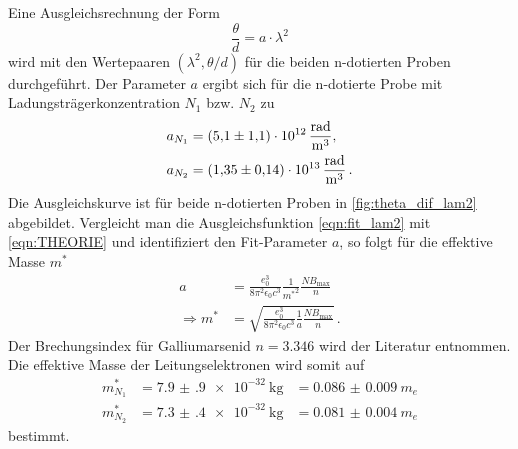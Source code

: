 Eine Ausgleichsrechnung der Form
\begin{equation}
    \frac{\theta}{d} = a \cdot \lambda^2
    \label{eqn:fit_lam2}
\end{equation}
wird mit den Wertepaaren $(\lambda^2, \theta / d)$ für die beiden n-dotierten Proben durchgeführt.
Der Parameter $a$ ergibt sich für die n-dotierte Probe mit Ladungsträgerkonzentration $N_1$ bzw. $N_2$ zu
\begin{align*}
    a_{N_1} &= \qty{5.1(11)e+12}{\frac{rad}{\metre^3}}, \\
    a_{N_2} &= \qty{1.35(14)e+13}{\frac{rad}{\metre^3}} \, . \\
\end{align*}
Die Ausgleichskurve ist für beide n-dotierten Proben in \autoref{fig:theta_dif_lam2} abgebildet.
Vergleicht man die Ausgleichsfunktion \autoref{eqn:fit_lam2} mit \autoref{eqn:THEORIE} und identifiziert den Fit-Parameter $a$, so folgt für die effektive Masse $m^*$%
\begin{align}
    a &= \frac{e_0^3}{8 \pi^2 \epsilon_0 c^3} \frac{1}{{m^*}^2} \frac{N B_\text{max}}{n} \\
    \Rightarrow m^* &= \sqrt{\frac{e_0^3}{8 \pi^2 \epsilon_0 c^3} \frac{1}{a} \frac{N B_\text{max}}{n}} \, .
\end{align}
Der Brechungsindex für Galliumarsenid $n = 3.346$ wird der Literatur \cite{GaAs_n} entnommen.
Die effektive Masse der Leitungselektronen wird somit auf
\begin{align*}
    m^*_{N_1} &= \qty{7.9(9)e-32}{\kilo\gram} &= \qty{0.086(9)}{m_e} \\
    m^*_{N_2} &= \qty{7.3(4)e-32}{\kilo\gram} &= \qty{0.081(4)}{m_e}
\end{align*}
bestimmt.
\FloatBarrier